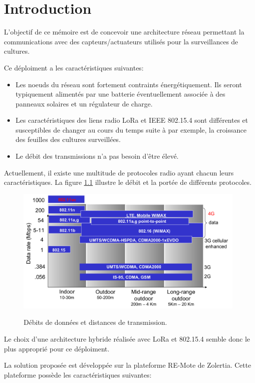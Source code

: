 \renewcommand{\leftmark}{INTRODUCTION}
\chapter{Introduction}\label{chap:intro}

L'objectif de ce mémoire est de concevoir une architecture réseau permettant la communications avec des capteurs/actuateurs utilisés pour la surveillances de cultures.

Ce déploiment a les caractéristiques suivantes:
\begin{itemize}
    \item Les noeuds du réseau sont fortement contraints énergétiquement. Ils seront typiquement alimentés
    par une batterie éventuellement associée à des panneaux solaires et un régulateur de charge.
    \item Les caractéristiques des liens radio LoRa et IEEE 802.15.4 sont différentes et susceptibles
    de changer au cours du temps suite à par exemple, la croissance des feuilles des cultures surveillées.
    \item Le débit des transmissions n'a pas besoin d'être élevé.
\end{itemize}

Actuellement, il existe une multitude de protocoles radio ayant chacun leurs caractéristiques.
La figure \ref{fig:intro-linkStandard} illustre le débit et la portée de différents protocoles.

\begin{figure}
    \centering
    \includegraphics[scale=0.3]{res/link-standard.png}
    \label{fig:intro-linkStandard}
    \caption{Débits de données et distances de transmission.}
\end{figure}

Le choix d'une architecture hybride réalisée avec LoRa et 802.15.4 semble donc le plus approprié
pour ce déploiment.

La solution proposée est développée sur la plateforme RE-Mote de Zolertia.
Cette plateforme possède les caractéristiques suivantes:
